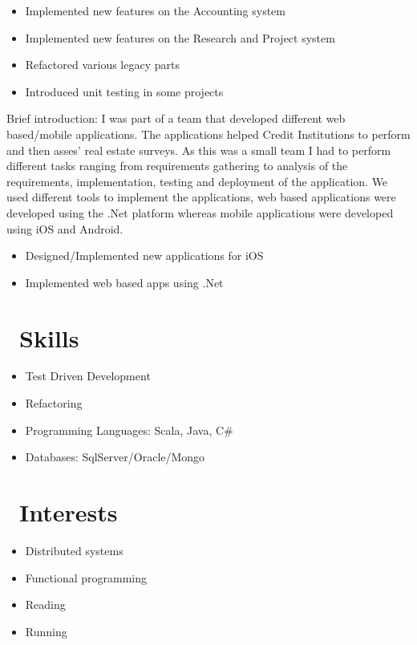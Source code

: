 \documentclass{resume}
\begin{document}
\begin{itemize}
  \item Implemented new features on the Accounting system
  \item Implemented new features on the Research and Project system
  \item Refactored various legacy parts
  \item Introduced unit testing in some projects
\end{itemize}

Brief introduction: I was part of a team that developed different web based/mobile applications.
The applications helped Credit Institutions to perform and then asses’ real estate surveys.
As this was a small team I had to perform different tasks ranging from requirements gathering to analysis of the requirements, implementation, testing and deployment of the application.
We used different tools to implement the applications, web based applications were developed using the .Net platform whereas mobile applications were developed using iOS and Android.

\begin{itemize}
  \item Designed/Implemented new applications for iOS
  \item Implemented web based apps using .Net
\end{itemize}


\section{\faCogs\ Skills}
\begin{itemize}[parsep=0.5ex]
  \item Test Driven Development
  \item Refactoring
  \item Programming Languages: Scala, Java, C\#
  \item Databases: SqlServer/Oracle/Mongo
\end{itemize}

\section{\faHeartO\ Interests}
\begin{itemize}[parsep=0.5ex]
  \item Distributed systems
  \item Functional programming
  \item Reading
  \item Running
\end{itemize}
\end{document}
